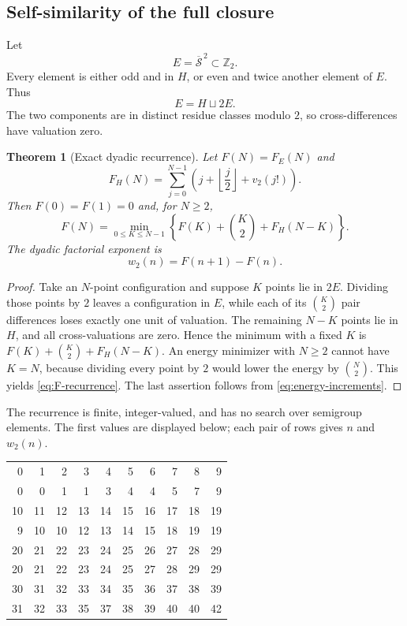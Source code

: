 \documentclass[11pt]{article}
\newtheorem{theorem}{Theorem}[section]
\theoremstyle{definition}
\theoremstyle{remark}
\newcommand{\Z}{\mathbb Z}
\newcommand{\calS}{\mathcal S}
\newcommand{\floor}[1]{\left\lfloor #1\right\rfloor}
\begin{document}
\subsection{Self-similarity of the full closure}
Let
\[
       E=\overline{\calS}^{\,2}\subset\Z_2.
\]
Every element is either odd and in $H$, or even and twice another element of $E$.  Thus
\begin{equation}\label{eq:E-decomp}
       E=H\sqcup 2E.
\end{equation}
The two components are in distinct residue classes modulo $2$, so cross-differences have valuation zero.

\begin{theorem}[Exact dyadic recurrence]\label{thm:dyadic-recurrence}
Let $F(N)=F_E(N)$ and
\[
       F_H(N)=\sum_{j=0}^{N-1}\left(j+\floor{\frac j2}+v_2(j!)\right).
\]
Then $F(0)=F(1)=0$ and, for $N\ge2$,
\begin{equation}\label{eq:F-recurrence}
       F(N)=\min_{0\le K\le N-1}
       \left\{F(K)+\binom K2+F_H(N-K)\right\}.
\end{equation}
The dyadic factorial exponent is
\[
       w_2(n)=F(n+1)-F(n).
\]
\end{theorem}
\begin{proof}
Take an $N$-point configuration and suppose $K$ points lie in $2E$.  Dividing those points by $2$ leaves a configuration in $E$, while each of its $\binom K2$ pair differences loses exactly one unit of valuation.  The remaining $N-K$ points lie in $H$, and all cross-valuations are zero.  Hence the minimum with a fixed $K$ is
$F(K)+\binom K2+F_H(N-K)$.  An energy minimizer with $N\ge2$ cannot have $K=N$, because dividing every point by $2$ would lower the energy by $\binom N2$.  This yields \eqref{eq:F-recurrence}.  The last assertion follows from \eqref{eq:energy-increments}.
\end{proof}

The recurrence is finite, integer-valued, and has no search over semigroup elements.  The first values are displayed below; each pair of rows gives $n$ and $w_2(n)$.
\begin{center}
\small
\begin{tabular}{*{10}{r}}
0 & 1 & 2 & 3 & 4 & 5 & 6 & 7 & 8 & 9 \\
0 & 0 & 1 & 1 & 3 & 4 & 4 & 5 & 7 & 9 \\
10 & 11 & 12 & 13 & 14 & 15 & 16 & 17 & 18 & 19 \\
9 & 10 & 10 & 12 & 13 & 14 & 15 & 18 & 19 & 19 \\
20 & 21 & 22 & 23 & 24 & 25 & 26 & 27 & 28 & 29 \\
20 & 21 & 22 & 23 & 24 & 25 & 27 & 28 & 29 & 29 \\
30 & 31 & 32 & 33 & 34 & 35 & 36 & 37 & 38 & 39 \\
31 & 32 & 33 & 35 & 37 & 38 & 39 & 40 & 40 & 42 \\
\end{tabular}
\end{center}
\end{document}
